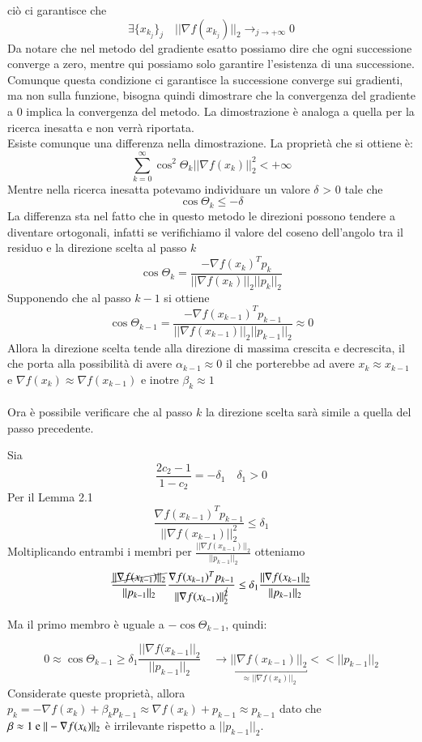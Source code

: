 ciò ci garantisce che
$$ \exists \{ x_{k_{j}} \}_{j} \quad || \nabla f(x_{k_{j}}) ||_{2} \longrightarrow_{j \to + \infty} 0$$
Da notare che nel metodo del gradiente esatto possiamo dire che ogni
successione converge a zero, mentre qui possiamo solo garantire
l'esistenza di una successione. Comunque questa condizione ci
garantisce la successione converge sui gradienti, ma non sulla
funzione, bisogna quindi dimostrare che la convergenza del gradiente a
0 implica la convergenza del metodo. La dimostrazione \`e analoga a
quella per la ricerca inesatta e non verrà riportata. \\ Esiste
comunque una differenza nella dimostrazione. La proprietà che si
ottiene \`e:
$$  \displaystyle \sum_{k=0}^{\infty} \cos^{2} \Theta_{k} || \nabla f(x_{k})||_{2}^{2} < +\infty $$
Mentre nella ricerca inesatta potevamo individuare un valore $\delta$
> 0 tale che
$$ \cos \Theta_{k} \leq  -\delta$$
La differenza sta nel fatto che in questo metodo le direzioni possono
tendere a diventare ortogonali, infatti se verifichiamo il valore del
coseno dell'angolo tra il residuo e la direzione scelta al passo $k$
$$ \cos \Theta_{k} = \frac{-\nabla f(x_{k})^{T} p_{k}}
      {|| \nabla f(x_{k})||_{2} ||p_{k}||_{2}}$$ Supponendo che al
passo $k-1$ si ottiene
$$ \cos \Theta_{k-1} = \frac{-\nabla f(x_{k-1})^{T} p_{k-1}}
      {|| \nabla f(x_{k-1})||_{2} ||p_{k-1}||_{2}} \approx 0$$ Allora
la direzione scelta tende alla direzione di massima crescita e
decrescita, il che porta alla possibilità di avere $\alpha_{k-1}
\approx 0$ il che porterebbe ad avere $x_{k} \approx x_{k-1}$ e
$\nabla f(x_{k}) \approx \nabla f(x_{k-1})$ e inotre $ \beta_{k}
\approx 1$\\ \\ Ora \`e possibile verificare che al passo $k$ la
direzione scelta sarà simile a quella del passo precedente.

Sia $$ \frac{2 c_2 -1}{1-c_2}= - \delta_{1} \quad \delta_{1} > 0 $$
Per il Lemma 2.1 %
$$\frac{\nabla f(x_{k-1})^{T}p_{k-1}}{|| \nabla f(x_{k-1})||_{2}^{2}} \leq \delta_{1}$$
Moltiplicando entrambi i membri per $\frac{||\nabla
f(x_{k-1})||_{2}}{|| p_{k-1}||_{2}}$ otteniamo
$$
\frac{\cancel{||\nabla f(x_{k-1})||_{2}}}{|| p_{k-1}||_{2}}
\frac{\nabla f(x_{k-1})^{T}p_{k-1}}{|| \nabla
f(x_{k-1})||_{2}^{\cancel{2}}} \leq \delta_{1} \frac{||\nabla
f(x_{k-1}||_{2}}{|| p_{k-1}||_{2}}
$$

Ma il primo membro \`e uguale a $-\cos \Theta_{k-1} $, quindi:

$$ 0 \approx \cos \Theta_{k-1} \geq 
\delta_{1} \frac{||\nabla f(x_{k-1}||_{2}}{|| p_{k-1}||_{2}} \quad
\rightarrow \underbracket{|| \nabla f(x_{k-1})||_{2}}_{\approx ||
\nabla f(x_{k})||_{2}} << ||p_{k-1} ||_{2}
$$
Considerate queste proprietà, allora $ p_{k} = -\nabla f(x_{k}) +
\beta_{k} p_{k-1} \approx \nabla f(x_{k}) + p_{k-1} \approx p_{k-1}$
dato che $\beta \approx 1 \text{ e }\\ || -\nabla f(x_{k})||_{2} $ \`e
irrilevante rispetto a $||p_{k-1}||_{2}$.

